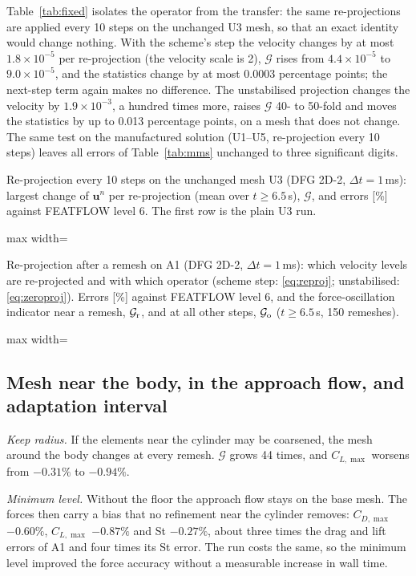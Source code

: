 \documentclass[preprint,12pt,number]{elsarticle}
\newcommand{\fittable}[1]{{\small\setlength{\tabcolsep}{4pt}\begin{adjustbox}{max width=\textwidth}\end{adjustbox}}}
\newcommand{\bu}{\mathbf{u}}
\newcommand{\dt}{\Delta t}
\begin{document}
Table~\ref{tab:fixed} isolates the operator from the transfer: the same re-projections are
applied every 10 steps on the unchanged U3 mesh, so that an exact identity would change
nothing. With the scheme's step the velocity changes by at most $1.8\times10^{-5}$ per
re-projection (the velocity scale is 2), $\mathcal{G}$ rises from $4.4\times10^{-5}$ to
$9.0\times10^{-5}$, and the statistics change by at most 0.0003 percentage points; the next-step
term again makes no difference. The unstabilised projection changes the velocity by
$1.9\times10^{-3}$, a hundred times more, raises $\mathcal{G}$ 40- to 50-fold and moves the statistics
by up to 0.013 percentage points, on a mesh that does not change. The same test on the
manufactured solution (U1--U5, re-projection every 10 steps) leaves all errors of
Table~\ref{tab:mms} unchanged to three significant digits.

\begin{table}[!htbp]
\centering
\caption{Re-projection every 10 steps on the unchanged mesh U3 (DFG 2D-2, $\dt = 1\,$ms):
largest change of $\bu^n$ per re-projection (mean over $t \ge 6.5\,$s), $\mathcal{G}$, and
errors [\%] against FEATFLOW level 6. The first row is the plain U3 run.}
\label{tab:fixed}
\fittable{tables/tab_fixed.tex}
\end{table}

\begin{table}[!htbp]
\centering
\caption{Re-projection after a remesh on A1 (DFG 2D-2, $\dt = 1\,$ms): which velocity levels
are re-projected and with which operator (scheme step: \eqref{eq:reproj}; unstabilised:
\eqref{eq:zeroproj}). Errors [\%] against FEATFLOW level 6, and the force-oscillation indicator
near a remesh, $\mathcal{G}_{\rm r}$, and at all other steps, $\mathcal{G}_{\rm o}$ ($t \ge 6.5\,$s,
150 remeshes).}
\label{tab:reproj}
\fittable{tables/tab_reproj.tex}
\end{table}

\subsection{Mesh near the body, in the approach flow, and adaptation interval}

\emph{Keep radius.} If the elements near the cylinder may be coarsened, the mesh around the body
changes at every remesh. $\mathcal{G}$ grows 44 times, and $C_{L,\max}$ worsens from $-0.31\%$ to
$-0.94\%$.

\emph{Minimum level.} Without the floor the approach flow stays on the base mesh. The forces
then carry a bias that no refinement near the cylinder removes: $C_{D,\max}$ $-0.60\%$,
$C_{L,\max}$ $-0.87\%$ and St $-0.27\%$, about three times the drag and lift errors of A1 and four times its St error. The run costs
the same, so the minimum level improved the force accuracy without a measurable increase in wall
time.
\end{document}
